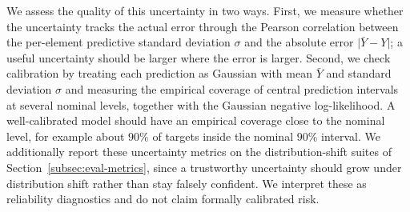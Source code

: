 We assess the quality of this uncertainty in two ways. First, we measure whether the uncertainty tracks the actual error through the Pearson correlation between the per-element predictive standard deviation $\sigma$ and the absolute error $\lvert \bar{Y} - Y \rvert$; a useful uncertainty should be larger where the error is larger. Second, we check calibration by treating each prediction as Gaussian with mean $\bar{Y}$ and standard deviation $\sigma$ and measuring the empirical coverage of central prediction intervals at several nominal levels, together with the Gaussian negative log-likelihood. A well-calibrated model should have an empirical coverage close to the nominal level, for example about $90\%$ of targets inside the nominal $90\%$ interval. We additionally report these uncertainty metrics on the distribution-shift suites of Section~\ref{subsec:eval-metrics}, since a trustworthy uncertainty should grow under distribution shift rather than stay falsely confident. We interpret these as reliability diagnostics and do not claim formally calibrated risk.
